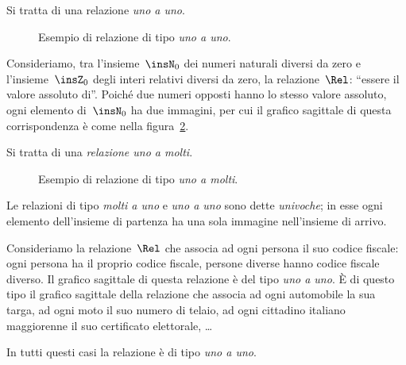 \begin{exrig}
\begin{esempio}
Si tratta di una relazione \emph{uno a uno}.
\begin{figure}[bht]
 \centering
 \caption{Esempio di relazione di tipo \emph{uno a uno}.}\label{fig:7.8}
\end{figure}
\end{esempio}

\begin{esempio}
Consideriamo, tra l'insieme~$\insN_0$ dei numeri naturali diversi da zero e l'insieme~$\insZ_0$ degli interi relativi diversi da zero, la relazione~$\Rel$: ``essere il valore assoluto di''.
Poiché due numeri opposti hanno lo stesso valore assoluto,
ogni elemento di~$\insN_0$ ha due immagini, per cui il grafico sagittale di questa corrispondenza è come nella figura~\ref{fig:7.9}.

Si tratta di una \emph{relazione uno a molti}.
\end{esempio}
\begin{figure}[hbt]
 \centering
 \caption{Esempio di relazione di tipo \emph{uno a molti}.}\label{fig:7.9}
\end{figure}

\end{exrig}

\begin{definizione}
Le relazioni di tipo \emph{molti a uno} e \emph{uno a uno} sono dette \emph{univoche}; in esse ogni elemento dell'insieme di partenza ha una sola immagine nell'insieme di arrivo.
\end{definizione}
\begin{exrig}
\begin{esempio}
Consideriamo la relazione~$\Rel$ che associa ad ogni persona il suo codice fiscale: ogni persona ha il proprio codice fiscale, persone diverse hanno codice fiscale diverso.
Il grafico sagittale di questa relazione
è del tipo \emph{uno a uno}. È di questo tipo il grafico sagittale della relazione che associa ad ogni automobile la sua targa, ad ogni moto il suo numero di telaio,
ad ogni cittadino italiano maggiorenne il suo certificato elettorale, \ldots

In tutti questi casi la relazione è di tipo \emph{uno a uno}.

\end{esempio}
\end{exrig}

\newpage

\cleardoublepage

